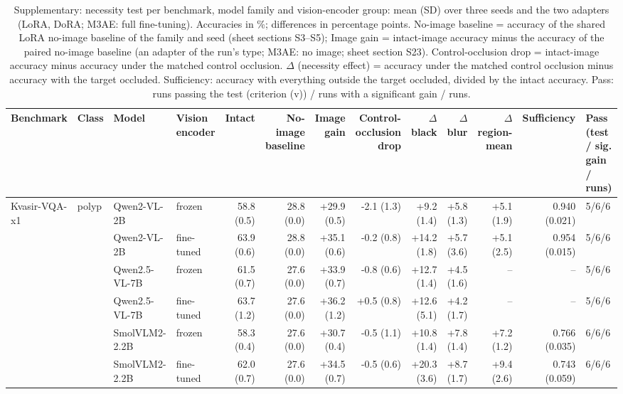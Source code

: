 \begin{table}[t]
\centering
\scriptsize
\setlength{\tabcolsep}{3pt}
\caption{Supplementary: necessity test per benchmark, model family and vision-encoder group: mean (SD) over three seeds and the two adapters (LoRA, DoRA; M3AE: full fine-tuning). Accuracies in \%; differences in percentage points. No-image baseline = accuracy of the shared LoRA no-image baseline of the family and seed (sheet sections S3--S5); Image gain = intact-image accuracy minus the accuracy of the paired no-image baseline (an adapter of the run's type; M3AE: no image; sheet section S23). Control-occlusion drop = intact-image accuracy minus accuracy under the matched control occlusion. $\Delta$ (necessity effect) = accuracy under the matched control occlusion minus accuracy with the target occluded. Sufficiency: accuracy with everything outside the target occluded, divided by the intact accuracy. Pass: runs passing the test (criterion (v)) / runs with a significant gain / runs.}
\label{tab:necessity}
\begin{tabular}{llllrrrrrrrrl}
\toprule
Benchmark & Class & Model & Vision encoder & Intact & No-image baseline & Image gain & Control-occlusion drop & $\Delta$ black & $\Delta$ blur & $\Delta$ region-mean & Sufficiency & Pass (test / sig. gain / runs) \\
\midrule
Kvasir-VQA-x1 & polyp & Qwen2-VL-2B & frozen & 58.8 (0.5) & 28.8 (0.0) & +29.9 (0.5) & -2.1 (1.3) & +9.2 (1.4) & +5.8 (1.3) & +5.1 (1.9) & 0.940 (0.021) & 5/6/6 \\
 &  & Qwen2-VL-2B & fine-tuned & 63.9 (0.6) & 28.8 (0.0) & +35.1 (0.6) & -0.2 (0.8) & +14.2 (1.8) & +5.7 (3.6) & +5.1 (2.5) & 0.954 (0.015) & 5/6/6 \\
 &  & Qwen2.5-VL-7B & frozen & 61.5 (0.7) & 27.6 (0.0) & +33.9 (0.7) & -0.8 (0.6) & +12.7 (1.4) & +4.5 (1.6) & -- & -- & 5/6/6 \\
 &  & Qwen2.5-VL-7B & fine-tuned & 63.7 (1.2) & 27.6 (0.0) & +36.2 (1.2) & +0.5 (0.8) & +12.6 (5.1) & +4.2 (1.7) & -- & -- & 5/6/6 \\
 &  & SmolVLM2-2.2B & frozen & 58.3 (0.4) & 27.6 (0.0) & +30.7 (0.4) & -0.5 (1.1) & +10.8 (1.4) & +7.8 (1.4) & +7.2 (1.2) & 0.766 (0.035) & 6/6/6 \\
 &  & SmolVLM2-2.2B & fine-tuned & 62.0 (0.7) & 27.6 (0.0) & +34.5 (0.7) & -0.5 (0.6) & +20.3 (3.6) & +8.7 (1.7) & +9.4 (2.6) & 0.743 (0.059) & 6/6/6 \\

\end{tabular}
\end{table}
